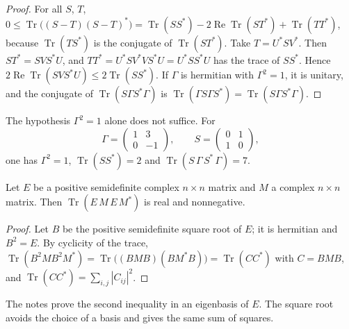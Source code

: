 \begin{proof}
For all $S$, $T$, $0 \le \operatorname{Tr}\bigl((S - T)(S - T)^*\bigr) = \operatorname{Tr}(SS^*) - 2\operatorname{Re}\operatorname{Tr}(ST^*) + \operatorname{Tr}(TT^*)$, because $\operatorname{Tr}(TS^*)$ is the conjugate of $\operatorname{Tr}(ST^*)$. Take $T = U^*SV^*$. Then $ST^* = SVS^*U$, and $TT^* = U^*SV^*VS^*U = U^*SS^*U$ has the trace of $SS^*$. Hence $2\operatorname{Re}\operatorname{Tr}(SVS^*U) \le 2\operatorname{Tr}(SS^*)$. If $\Gamma$ is hermitian with $\Gamma^2 = 1$, it is unitary, and the conjugate of $\operatorname{Tr}(S\Gamma S^*\Gamma)$ is $\operatorname{Tr}(\Gamma S\Gamma S^*) = \operatorname{Tr}(S\Gamma S^*\Gamma)$.
\end{proof}

\begin{contrexemple}\label{cex:quillen-1983-ln8}
The hypothesis $\Gamma^2 = 1$ alone does not suffice. For
\[
  \Gamma = \begin{pmatrix} 1 & 3 \\ 0 & -1 \end{pmatrix}, \qquad S = \begin{pmatrix} 0 & 1 \\ 1 & 0 \end{pmatrix},
\]
one has $\Gamma^2 = 1$, $\operatorname{Tr}(SS^*) = 2$ and $\operatorname{Tr}(S\,\Gamma\,S^*\,\Gamma) = 7$.
\end{contrexemple}

\begin{encadre}
\begin{theoreme}\label{thm:quillen-1983-ln8-b}
Let $E$ be a positive semidefinite complex $n \times n$ matrix and $M$ a complex $n \times n$ matrix. Then $\operatorname{Tr}(E\,M\,E\,M^*)$ is real and nonnegative.
\end{theoreme}
\end{encadre}

\begin{proof}
Let $B$ be the positive semidefinite square root of $E$; it is hermitian and $B^2 = E$. By cyclicity of the trace, $\operatorname{Tr}(B^2MB^2M^*) = \operatorname{Tr}\bigl((BMB)(BM^*B)\bigr) = \operatorname{Tr}(CC^*)$ with $C = BMB$, and $\operatorname{Tr}(CC^*) = \sum_{i,j}|C_{ij}|^2$.
\end{proof}

\noindent The notes prove the second inequality in an eigenbasis of $E$. The square root avoids the choice of a basis and gives the same sum of squares.

